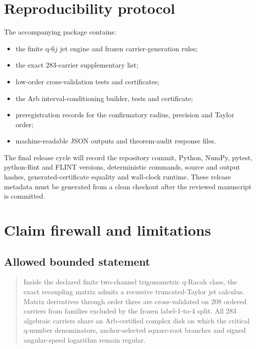 \section{Reproducibility protocol}
The accompanying package contains:
\begin{itemize}[leftmargin=2em]
\item the finite q-$6j$ jet engine and frozen carrier-generation rules;
\item the exact 283-carrier supplementary list;
\item low-order cross-validation tests and certificates;
\item the Arb interval-conditioning builder, tests and certificate;
\item preregistration records for the confirmatory radius, precision and Taylor order;
\item machine-readable JSON outputs and theorem-audit response files.
\end{itemize}

The final release cycle will record the repository commit, Python, NumPy, pytest, python-flint and FLINT versions, deterministic commands, source and output hashes, generated-certificate equality and wall-clock runtime.  These release metadata must be generated from a clean checkout after the reviewed manuscript is committed.

\section{Claim firewall and limitations}
\subsection{Allowed bounded statement}
\begin{quote}
Inside the declared finite two-channel trigonometric q-Racah class, the exact recoupling matrix admits a recursive truncated-Taylor jet calculus.  Matrix derivatives through order three are cross-validated on 208 ordered carriers from families excluded by the frozen label-1-to-4 split.  All 283 algebraic carriers share an Arb-certified complex disk on which the critical q-number denominators, anchor-selected square-root branches and signed angular-speed logarithm remain regular.
\end{quote}

